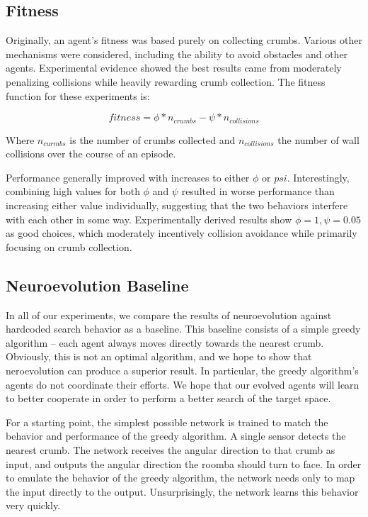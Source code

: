 \documentclass[conference]{IEEEtran}
\begin{document}
\subsection{Fitness}
Originally, an agent's fitness was based purely on collecting crumbs. Various other mechanisms were considered, including the ability to avoid obstacles and other agents. Experimental evidence showed the best results came from moderately penalizing collisions while heavily rewarding crumb collection. The fitness function for these experiments is:


\[ fitness = \phi * n_{crumbs} - \psi * n_{collisions}\]

Where $n_{curmbs}$ is the number of crumbs collected and $n_{collisions}$ the number of wall collisions over the course of an episode. 
 
Performance generally improved with increases to either $\phi$ or $psi$.
Interestingly, combining high values for both $\phi$ and $\psi$ resulted in worse performance than increasing either value individually, suggesting that the two behaviors interfere with each other in some way. 
Experimentally derived results show $\phi = 1, \psi = 0.05$ as good choices, which moderately incentively collision avoidance while primarily focusing on crumb collection. 



\subsection{Neuroevolution Baseline}

In all of our experiments, we compare the results of neuroevolution against hardcoded search behavior as a baseline. This baseline consists of a simple greedy algorithm -- each agent always moves directly towards the nearest crumb. Obviously, this is not an optimal algorithm, and we hope to show that neroevolution can produce a superior result. In particular, the greedy algorithm's agents do not coordinate their efforts. We hope that our evolved agents will learn to better cooperate in order to perform a better search of the target space.

For a starting point, the simplest possible network is trained to match the behavior and performance of the greedy algorithm. A single sensor detects the nearest crumb. The network receives the angular direction to that crumb as input, and outputs the angular direction the roomba should turn to face. In order to emulate the behavior of the greedy algorithm, the network needs only to map the input directly to the output. Unsurprisingly, the network learns this behavior very quickly.
\end{document}
